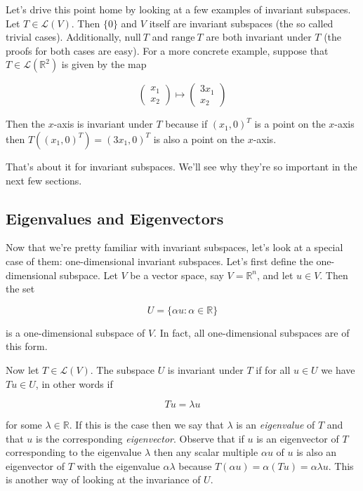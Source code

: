 \documentclass[12pt]{article}
\begin{document}
Let's drive this point home by looking at a few examples of invariant subspaces. Let $T \in \mathcal{L}(V)$. Then $\{0\}$ and $V$ itself are invariant subspaces (the so called trivial cases). Additionally, $\textrm{null} \: T$ and $\textrm{range} \: T$ are both invariant under $T$ (the proofs for both cases are easy). For a more concrete example, suppose that $T \in \mathcal{L} (\mathbb{R}^2)$ is given by the map

\[ \begin{pmatrix}
x_1 \\
x_2
\end{pmatrix}
%
\mapsto
\begin{pmatrix}
3x_1 \\
x_2
\end{pmatrix}
\]

Then the $x$-axis is invariant under $T$ because if $(x_1, 0)^T$ is a point on the $x$-axis then $T((x_1, 0)^T) = (3x_1, 0)^T$ is also a point on the $x$-axis.

That's about it for invariant subspaces. We'll see why they're so important in the next few sections.


\subsection*{Eigenvalues and Eigenvectors}

Now that we're pretty familiar with invariant subspaces, let's look at a special case of them:  one-dimensional invariant subspaces. Let's first define the one-dimensional subspace.
Let $V$ be a vector space, say $V = \mathbb{R}^n$, and let $u \in V$. Then the set

$$U = \{ \alpha u : \alpha \in \mathbb{R} \}$$

is a one-dimensional subspace of $V$. In fact, all one-dimensional subspaces are of this form.

Now let $T \in \mathcal{L} (V)$. The subspace $U$ is invariant under $T$ if for all $u \in U$ we have $Tu \in U$, in other words if

$$Tu = \lambda u$$

for some $\lambda \in \mathbb{R}$. If this is the case then we say that $\lambda$ is an \textit{eigenvalue} of $T$ and that $u$ is the corresponding \textit{eigenvector}. Observe that if $u$ is an eigenvector of $T$ corresponding to the eigenvalue $\lambda$ then any scalar multiple $\alpha u$ of $u$ is also an eigenvector of $T$ with the eigenvalue $\alpha \lambda$ because $T(\alpha u) = \alpha (Tu) = \alpha \lambda u$. This is another way of looking at the invariance of $U$.
\end{document}
